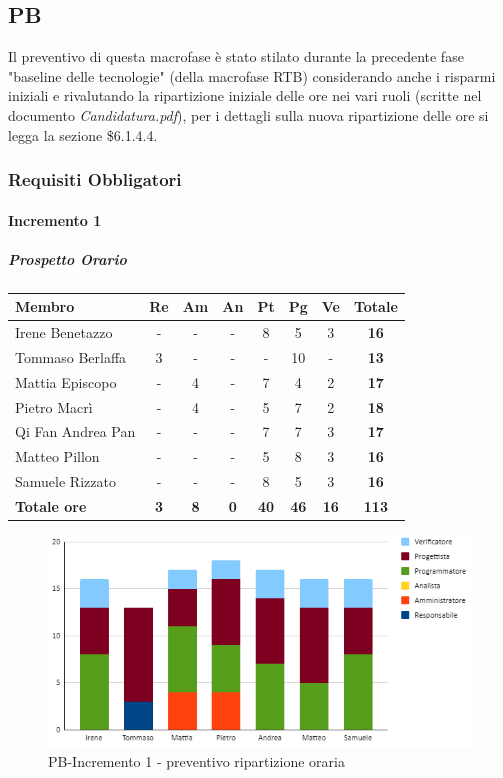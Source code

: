 \subsection{PB}
Il preventivo di questa macrofase è stato stilato durante la precedente fase "baseline delle tecnologie" (della macrofase RTB) considerando anche i risparmi iniziali e rivalutando la ripartizione iniziale delle ore nei vari ruoli (scritte nel documento \emph{Candidatura.pdf}), per i dettagli sulla nuova ripartizione delle ore si legga la sezione \$6.1.4.4.
\subsubsection{Requisiti Obbligatori}
\paragraph{Incremento 1}
\subparagraph{Prospetto Orario}
\begin{center}
	\renewcommand{\arraystretch}{1.8} %
	\begin{tabular}{ |m{10em}|c|c|c|c|c|c|c| }
	\hline
	\textbf{Membro} & \textbf{Re} & \textbf{Am} &  \textbf{An} &  \textbf{Pt} &  \textbf{Pg} &  \textbf{Ve} &  \textbf{Totale}\\
    \hline
    Irene Benetazzo   & - & - & - & 8 & 5 & 3 & \textbf{16} \\
    \hline
    Tommaso Berlaffa  & 3 & - & - & - & 10 & - & \textbf{13} \\
    \hline
    Mattia Episcopo   & - & 4 & - & 7 & 4 & 2 & \textbf{17} \\
    \hline
    Pietro Macrì      & - & 4 & - & 5 & 7 & 2 & \textbf{18} \\
    \hline
    Qi Fan Andrea Pan & - & - & - & 7 & 7 & 3 & \textbf{17} \\
    \hline
    Matteo Pillon     & - & - & - & 5 & 8 & 3 & \textbf{16} \\
    \hline
    Samuele Rizzato   & - & - & - & 8 & 5 & 3 & \textbf{16} \\
    \hline
    \textbf{Totale ore} & \textbf{3} & \textbf{8} &  \textbf{0} &  \textbf{40} &  \textbf{46} &  \textbf{16} &  \textbf{113}\\
    \hline
	\end{tabular}
\end{center}
\begin{figure}[H]
   \centering\includegraphics{images/preventivo/PB-incremento1-ore.png}
   \caption{PB-Incremento 1 - preventivo ripartizione oraria}
\end{figure}



